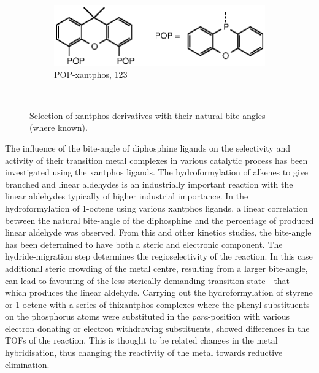 \begin{figure}[htbp]
~
\begin{subfigure}[b]{0.6\textwidth}
	\centering
	\includegraphics{../Figures/Xantphosderivatives/POP-xantphos.eps}
	\caption{POP-xantphos, 123\degrees}
	\label{POP-xantphos}
\end{subfigure}
\\
\caption[Selection of xantphos derivatives]{Selection of xantphos derivatives with their natural bite-angles (where known).\cite{Dierkes1999, Veen1999, Veen2000, Veen2000b}}
\label{xantphosderivatives}
\end{figure}

The influence of the bite-angle of diphosphine ligands on the selectivity and activity of their transition metal complexes in various catalytic process has been investigated using the xantphos ligands.  The hydroformylation of alkenes to give branched and linear aldehydes is an industrially important reaction with the linear aldehydes typically of higher industrial importance.  In the hydroformylation of 1-octene using various xantphos ligands, a linear correlation between the natural bite-angle of the diphosphine and the percentage of produced linear aldehyde was observed.\cite{Kranenburg1995}  From this and other kinetics studies, the bite-angle has been determined to have both a steric and electronic component.  The hydride-migration step determines the regioselectivity of the reaction.  In this case additional steric crowding of the metal centre, resulting from a larger bite-angle, can lead to favouring of the less sterically demanding transition state - that which produces the linear aldehyde.\cite{Freixa2003}  Carrying out the hydroformylation of styrene or 1-octene with a series of thixantphos complexes where the phenyl substituents on the phosphorus atoms were substituted in the \emph{para}-position with various electron donating or electron withdrawing substituents, showed differences in the \glspl{TOF} of the reaction.\cite{Veen1998}  This is thought to be related changes in the metal hybridisation, thus changing the reactivity of the metal towards reductive elimination.\cite{Slot2002, Freixa2003}

